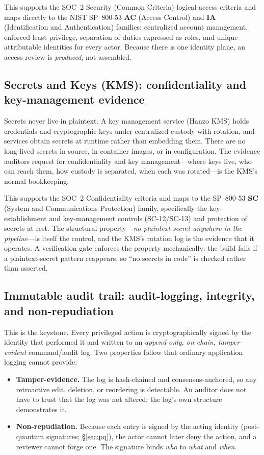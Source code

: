 \documentclass[11pt,letterpaper]{article}
\begin{document}
This supports the SOC~2 Security (Common Criteria) logical-access criteria and maps
directly to the NIST SP~800-53 \textbf{AC} (Access Control) and \textbf{IA}
(Identification and Authentication) families: centralized account management, enforced
least privilege, separation of duties expressed as roles, and unique attributable
identities for every actor. Because there is one identity plane, an access review is
\emph{produced}, not assembled.

\subsection{Secrets and Keys (KMS): confidentiality and key-management evidence}

Secrets never live in plaintext. A key management service (Hanzo KMS) holds
credentials and cryptographic keys under centralized custody with rotation, and
services obtain secrets at runtime rather than embedding them. There are no
long-lived secrets in source, in container images, or in configuration. The evidence
auditors request for confidentiality and key management---where keys live, who can
reach them, how custody is separated, when each was rotated---is the KMS's normal
bookkeeping.

This supports the SOC~2 Confidentiality criteria and maps to the SP~800-53
\textbf{SC} (System and Communications Protection) family, specifically the
key-establishment and key-management controls (SC-12/SC-13) and protection of
secrets at rest. The structural property---\emph{no plaintext secret anywhere in the
pipeline}---is itself the control, and the KMS's rotation log is the evidence that it
operates. A verification gate enforces the property mechanically: the build fails if a
plaintext-secret pattern reappears, so ``no secrets in code'' is checked rather than
asserted.

\subsection{Immutable audit trail: audit-logging, integrity, and non-repudiation}

This is the keystone. Every privileged action is cryptographically signed by the
identity that performed it and written to an \emph{append-only, on-chain,
tamper-evident} command/audit log. Two properties follow that ordinary application
logging cannot provide:

\begin{itemize}
  \item \textbf{Tamper-evidence.} The log is hash-chained and consensus-anchored, so
  any retroactive edit, deletion, or reordering is detectable. An auditor does not
  have to trust that the log was not altered; the log's own structure demonstrates it.
  \item \textbf{Non-repudiation.} Because each entry is signed by the acting
  identity (post-quantum signatures; \S\ref{sec:pq}), the actor cannot later deny the
  action, and a reviewer cannot forge one. The signature binds \emph{who} to
  \emph{what} and \emph{when}.
\end{itemize}
\end{document}
